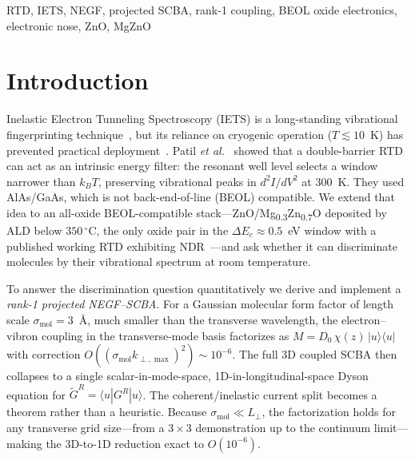 \documentclass[conference]{IEEEtran}
\begin{document}
\begin{IEEEkeywords}
RTD, IETS, NEGF, projected SCBA, rank-1 coupling, BEOL oxide electronics,
electronic nose, ZnO, MgZnO
\end{IEEEkeywords}

\section{Introduction}
Inelastic Electron Tunneling Spectroscopy (IETS) is a long-standing
vibrational fingerprinting technique~\cite{jaklevic1966}, but its reliance
on cryogenic operation ($T \lesssim 10$~K) has prevented practical
deployment~\cite{galperin2007}. Patil
\textit{et al.}~\cite{patil2018} showed that a double-barrier RTD can act
as an intrinsic energy filter: the resonant well level selects a window
narrower than $k_BT$, preserving vibrational peaks in $d^2I/dV^2$ at 300~K.
They used AlAs/GaAs, which is not back-end-of-line (BEOL) compatible. We
extend that idea to an all-oxide BEOL-compatible stack---ZnO/Mg\textsubscript{0.3}Zn\textsubscript{0.7}O
deposited by ALD below $350\,^\circ$C, the only oxide pair in the
$\Delta E_c \!\approx\! 0.5$~eV window with a published working RTD
exhibiting NDR~\cite{krishnamoorthy2002}---and ask whether it can discriminate
molecules by their vibrational spectrum at room temperature.

To answer the discrimination question quantitatively we derive and
implement a \emph{rank-1 projected NEGF--SCBA}. For a Gaussian molecular
form factor of length scale $\sigma_{\mathrm{mol}} = 3$~\AA, much smaller
than the transverse wavelength, the electron--vibron coupling in the
transverse-mode basis factorizes as $M = D_0\,\chi(z)\,|u\rangle\langle u|$
with correction $O((\sigma_{\mathrm{mol}} k_{\perp,\max})^2) \sim 10^{-6}$.
The full 3D coupled SCBA then collapses to a single scalar-in-mode-space,
1D-in-longitudinal-space Dyson equation for $\tilde G^R = \langle u|G^R|u
\rangle$. The coherent/inelastic current split becomes a theorem rather
than a heuristic. Because $\sigma_{\mathrm{mol}} \ll L_\perp$, the
factorization holds for any transverse grid size---from a $3\times 3$
demonstration up to the continuum limit---making the 3D-to-1D reduction
exact to $O(10^{-6})$.

\end{document}
